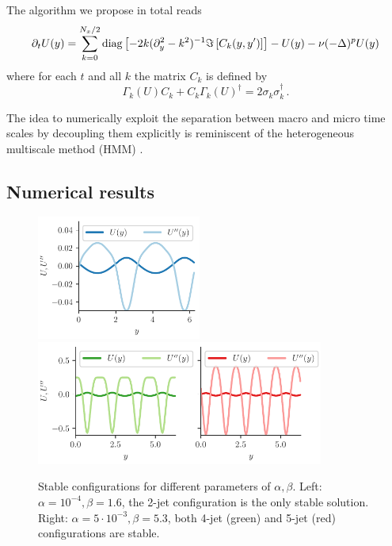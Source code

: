 \documentclass[12pt]{amsart}
\begin{document}
The algorithm we propose in total reads
\begin{equation}
  \label{eq:num}
  \partial_t U(y) = \sum_{k=0}^{N_x/2}\mathrm{diag}\left[ -2k(\partial_y^2-k^2)^{-1} \Im \left[C_k(y,y')\right]\right] - U(y) - \nu (-\Delta)^p U(y)\\
\end{equation}
where for each $t$ and all $k$ the matrix $C_k$ is defined by
\begin{equation}
  \Gamma_k(U) C_k + C_k \Gamma_k(U)^\dagger = 2 \sigma_k \sigma_k^\dagger\,.
\end{equation}

The idea to numerically exploit the separation between macro and micro
time scales by decoupling them explicitly is reminiscent of the
heterogeneous multiscale method (HMM) \cite{e-engquist-huang:2003,
  e-engquist-li-etal:2007}.

\subsection{Numerical results}
\label{sec:fixedpoints-numerics}

\begin{figure}[t]
  \begin{center}
    \includegraphics[height=115pt]{figures/stable-2jet}\hspace{-0.2em}
    \includegraphics[height=115pt]{figures/stable-4-5-jet}
  \end{center}
  \caption{Stable configurations for different parameters of
    $\alpha,\beta$. Left: $\alpha=10^{-4}, \beta=1.6$, the 2-jet
    configuration is the only stable solution. Right:
    $\alpha=5\cdot10^{-3}, \beta=5.3$, both 4-jet (green) and 5-jet
    (red) configurations are stable.\label{fig:stable}}
\end{figure}
\end{document}
